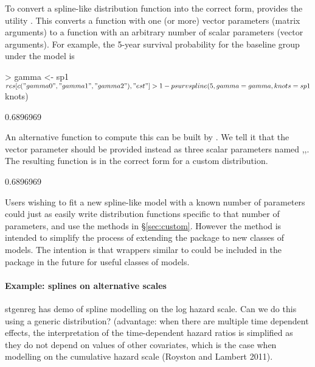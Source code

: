 \documentclass[nojss,nofooter]{jss}
\begin{document}
To convert a spline-like distribution function into the correct form,
 provides the utility .  This
converts a function with one (or more) vector parameters (matrix
arguments) to a function with an arbitrary number of scalar parameters
(vector arguments).  For example, the 5-year survival probability for the baseline group 
under the model  is
\begin{Schunk}
\begin{Sinput}
> gamma <- sp1$res[c("gamma0","gamma1","gamma2"),"est"]
> 1 - psurvspline(5, gamma=gamma, knots=sp1$knots)
\end{Sinput}
\begin{Soutput}
[1] 0.6896969
\end{Soutput}
\end{Schunk}
An alternative function to compute this can be built by .  We tell it that the 
vector parameter  should be provided instead as three scalar parameters
named ,,.  The resulting function 
is in the correct form for a custom  distribution.
\begin{Schunk}
\begin{Soutput}
[1] 0.6896969
\end{Soutput}
\end{Schunk}

Users wishing to fit a new spline-like model with a known number of
parameters could just as easily write distribution functions specific
to that number of parameters, and use the methods in
\S\ref{sec:custom}.  However the  method is
intended to simplify the process of extending the 
package to new classes of models.  The intention is that wrappers
similar to  could be included in the package in
the future for useful classes of models.


\paragraph{Example: splines on alternative scales}

stgenreg has demo of spline modelling on the log hazard scale.  Can we do this using a generic distribution? 
(advantage: when there are multiple time dependent effects, the
interpretation of the time-dependent hazard ratios is simplified as
they do not depend on values of other covariates, which is the case
when modelling on the cumulative hazard scale (Royston and Lambert
2011).
\end{document}
